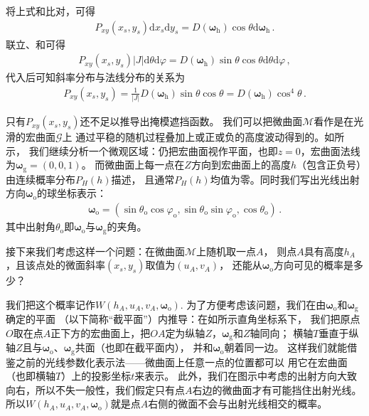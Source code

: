 将上式和比对，可得
\begin{align}\label{eq:08-ex01-P2D}
    P_{xy}(x_s,y_s)\mathrm{d}x_s\mathrm{d}y_s=
    D({\bm\omega}_{\mathrm{h}})\cos\theta\mathrm{d}{\bm\omega}_{\mathrm{h}}\, .
\end{align}
联立、和可得
\begin{align}
    P_{xy}(x_s,y_s)|J|\mathrm{d}\theta\mathrm{d}\varphi
    =D({\bm\omega}_{\mathrm{h}})\sin\theta\cos\theta\mathrm{d}\theta\mathrm{d}\varphi\, ,
\end{align}
代入后可知斜率分布与法线分布的关系为
\begin{align}\label{eq:08-ex01-relation-P2D-McrofacetDistribution}
    P_{xy}(x_s,y_s)=\frac{1}{|J|}D({\bm\omega}_{\mathrm{h}})\sin\theta\cos\theta
    =D({\bm\omega}_{\mathrm{h}})\cos^4\theta\, .
\end{align}

只有$P_{xy}(x_s,y_s)$还不足以推导出掩模遮挡函数。
我们可以把微曲面$\mathcal{M}$看作是在光滑的宏曲面$\mathcal{G}$上
通过平稳的随机过程叠加上或正或负的高度波动得到的。如所示，
我们继续分析一个微观区域：仍把宏曲面视作平面，也即$z=0$，宏曲面法线为${\bm\omega}_{\mathrm{g}}=(0,0,1)$。
而微曲面上每一点在$Z$方向到宏曲面上的高度$h$（包含正负号）由连续概率分布$P_H(h)$描述，
且通常$P_H(h)$均值为零。同时我们写出光线出射方向${\bm\omega}_{\mathrm{o}}$的球坐标表示：
\begin{align}
    {\bm\omega}_{\mathrm{o}}=(\sin\theta_{\mathrm{o}}\cos\varphi_{\mathrm{o}},\sin\theta_{\mathrm{o}}\sin\varphi_{\mathrm{o}},\cos\theta_{\mathrm{o}})\, .
\end{align}
其中出射角$\theta_{\mathrm{o}}$即${\bm\omega}_{\mathrm{o}}$与${\bm\omega}_{\mathrm{g}}$的夹角。

接下来我们考虑这样一个问题：在微曲面$\mathcal{M}$上随机取一点$A$，
则点$A$具有高度$h_A$，且该点处的微面斜率$(x_s,y_s)$取值为$(u_A,v_A)$，
还能从${\bm\omega}_{\mathrm{o}}$方向可见的概率是多少？

我们把这个概率记作$W(h_A,u_A,v_A,{\bm\omega}_{\mathrm{o}})$.
为了方便考虑该问题，我们在由${\bm\omega}_{\mathrm{o}}$和${\bm\omega}_{\mathrm{g}}$确定的平面
（以下简称“截平面”）内推导：在如所示直角坐标系下，
我们把原点$O$取在点$A$正下方的宏曲面上，把$OA$定为纵轴$Z$，${\bm\omega}_{\mathrm{g}}$和$Z$轴同向；
横轴$T$垂直于纵轴$Z$且与${\bm\omega}_{\mathrm{o}}$、${\bm\omega}_{\mathrm{g}}$共面（也即在截平面内），
并和${\bm\omega}_{\mathrm{o}}$朝着同一边。
这样我们就能借鉴之前的光线参数化表示法——微曲面上任意一点的位置都可以
用它在宏曲面（也即横轴$T$）上的投影坐标$t$来表示。
此外，我们在图示中考虑的出射方向大致向右，所以不失一般性，我们假定只有点$A$右边的微曲面才有可能挡住出射光线。
所以$W(h_A,u_A,v_A,{\bm\omega}_{\mathrm{o}})$就是点$A$右侧的微面不会与出射光线相交的概率。

